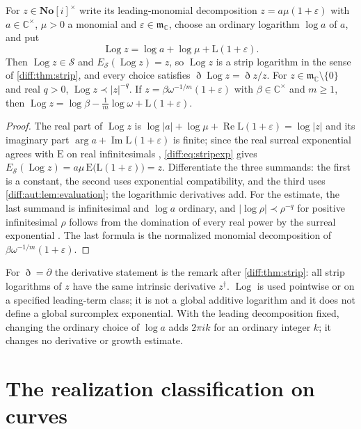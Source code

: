 \documentclass[11pt,letterpaper]{article}
\numberwithin{equation}{section}
\theoremstyle{definition}
\theoremstyle{remark}
\newcommand{\SC}{\mathbf{No}[i]}
\newcommand{\C}{\mathbb C}
\newcommand{\der}{\partial}
\newcommand{\mm}{\mathfrak m}
\newcommand{\Ree}{\operatorname{Re}}
\newcommand{\Imm}{\operatorname{Im}}
\newcommand{\Emm}{\mathrm{E}}
\newcommand{\Lmm}{\mathrm{L}}
\newcommand{\Strip}{\mathcal S}
\newcommand{\Estrip}{E_{\Strip}}
\newcommand{\abs}[1]{\lvert#1\rvert}
\newcommand{\Dn}{\eth}
\newcommand{\Log}{\operatorname{Log}}
\begin{document}
\begin{lemma}
\label{diff:aut:lem:log}
For $z\in\SC^{\times}$ write its leading-monomial decomposition
$z=a\mu(1+\varepsilon)$ with $a\in\C^{\times}$, $\mu>0$ a monomial and
$\varepsilon\in\mm_{\C}$, choose an ordinary logarithm $\log a$ of $a$, and put
\begin{equation}\label{diff:aut:eq:Log}
 \Log z=\log a+\log\mu+\Lmm(1+\varepsilon).
\end{equation}
Then $\Log z\in\Strip$ and $\Estrip(\Log z)=z$, so $\Log z$ is a strip logarithm
in the sense of \cref{diff:thm:strip}, and every choice satisfies
$\Dn\Log z=\Dn z/z$. For $z\in\mm_{\C}\setminus\{0\}$ and real $q>0$,
$\Log z\prec\abs z^{-q}$. If $z=\beta\omega^{-1/m}(1+\varepsilon)$ with
$\beta\in\C^{\times}$ and $m\geq1$, then
$\Log z=\log\beta-\tfrac1m\log\omega+\Lmm(1+\varepsilon)$.
\end{lemma}
\begin{proof}
The real part of $\Log z$ is $\log\abs a+\log\mu+\Ree\Lmm(1+\varepsilon)=\log\abs z$
and its imaginary part $\arg a+\Imm\Lmm(1+\varepsilon)$ is finite; since the
real surreal exponential agrees with $\Emm$ on real infinitesimals
\cite{Gonshor}, \cref{diff:eq:stripexp} gives
$\Estrip(\Log z)=a\mu\,\Emm\bigl(\Lmm(1+\varepsilon)\bigr)=z$. Differentiate the three
summands: the first is a constant, the second uses exponential compatibility,
and the third uses \cref{diff:aut:lem:evaluation}; the logarithmic derivatives
add. For the estimate, the last summand is infinitesimal and $\log a$ ordinary,
and $\abs{\log\rho}\prec\rho^{-q}$ for positive infinitesimal $\rho$ follows from
the domination of every real power by the surreal exponential \cite{BM}.
The last formula is the normalized monomial decomposition of
$\beta\omega^{-1/m}(1+\varepsilon)$.
\end{proof}

For $\Dn=\der$ the derivative statement is the remark after
\cref{diff:thm:strip}: all strip logarithms of $z$ have the same intrinsic
derivative $z^{\dagger}$. $\Log$ is used pointwise or on a specified
leading-term class; it is not a global additive logarithm and it does not
define a global surcomplex exponential. With the leading decomposition fixed,
changing the ordinary choice of $\log a$ adds $2\pi i k$ for an ordinary
integer $k$; it changes no derivative or growth estimate.

\section{The realization classification on curves}
\label{diff:aut:sec:curves}
\end{document}
